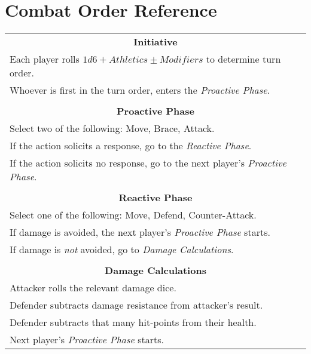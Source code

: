 \section{Combat Order Reference}\label{sec:combat-order}
\begin{center}
\begin{tabular}{l}
    \multicolumn{1}{c}{\textbf{Initiative}}\\
    Each player rolls $1d6 + Athletics \pm Modifiers$ to determine turn order.\\
    Whoever is first in the turn order, enters the \textit{Proactive Phase}.\\\hline\\
    \multicolumn{1}{c}{\textbf{Proactive Phase}}\\
    Select two of the following: Move, Brace, Attack.\\
    If the action solicits a response, go to the \textit{Reactive Phase}.\\
    If the action solicits no response, go to the next player's \textit{Proactive Phase}.\\\hline\\
    \multicolumn{1}{c}{\textbf{Reactive Phase}}\\
    Select one of the following: Move, Defend, Counter-Attack.\\
    If damage is avoided, the next player's \textit{Proactive Phase} starts.\\
    If damage is \textit{not} avoided, go to \textit{Damage Calculations}.\\\hline\\
    \multicolumn{1}{c}{\textbf{Damage Calculations}}\\
    Attacker rolls the relevant damage dice.\\
    Defender subtracts damage resistance from attacker's result.\\
    Defender subtracts that many hit-points from their health.\\
    Next player's \textit{Proactive Phase} starts.\\
\end{tabular}
\end{center}